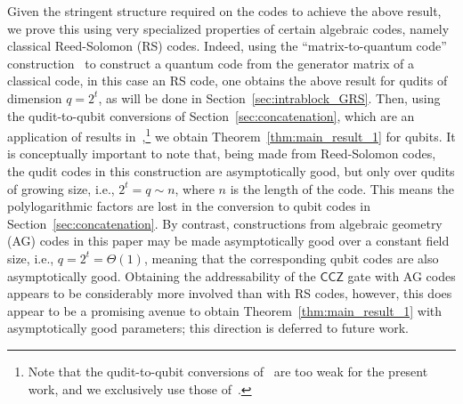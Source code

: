 \documentclass[11pt]{article}
\theoremstyle{definition}
\newcommand{\CCZ}{\mathsf{CCZ}}
\begin{document}
    Given the stringent structure required on the codes to achieve the above result, we prove this using very specialized properties of certain algebraic codes, namely classical Reed-Solomon (RS) codes. Indeed, using the ``matrix-to-quantum code'' construction~\cite{bravyi2012magic,krishna2019towards,wills2024constant} to construct a quantum code from the generator matrix of a classical code, in this case an RS code, one obtains the above result for qudits of dimension $q=2^t$, as will be done in Section~\ref{sec:intrablock_GRS}. Then, using the qudit-to-qubit conversions of Section~\ref{sec:concatenation}, which are  an application of results in~\cite{nguyen2024goodbinaryquantumcodes,golowich2024asymptoticallygoodquantumcodes},\footnote{Note that the qudit-to-qubit conversions of~\cite{wills2024constant} are too weak for the present work, and we exclusively use those of~\cite{nguyen2024goodbinaryquantumcodes,golowich2024asymptoticallygoodquantumcodes}.} we obtain Theorem~\ref{thm:main_result_1} for qubits. It is conceptually important to note that, being made from Reed-Solomon codes, the qudit codes in this construction are asymptotically good, but only over qudits of growing size, i.e., $2^t = q \sim n$, where $n$ is the length of the code. This means the polylogarithmic factors are lost in the conversion to qubit codes in Section~\ref{sec:concatenation}. By contrast, constructions from algebraic geometry (AG) codes in this paper may be made asymptotically good over a constant field size, i.e., $q = 2^t = \Theta(1)$, meaning that the corresponding qubit codes are also asymptotically good. Obtaining the addressability of the $\CCZ$ gate with AG codes appears to be considerably more involved than with RS codes, however, this does appear to be a promising avenue to obtain Theorem~\ref{thm:main_result_1} with asymptotically good parameters; this direction is deferred to future work.
\end{document}

